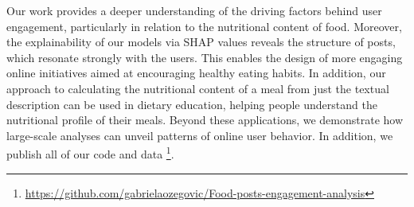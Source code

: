 Our work provides a deeper understanding of the driving factors behind user engagement, particularly in relation to the nutritional content of food.
Moreover, the explainability of our models via SHAP values reveals the structure of posts, which resonate strongly with the users.
This enables the design of more engaging online initiatives aimed at encouraging healthy eating habits.
In addition, our approach to calculating the nutritional content of a meal from just the textual description can be used in dietary education, helping people understand the nutritional profile of their meals.
Beyond these applications, we demonstrate how large-scale analyses can unveil patterns of online user behavior.
In addition, we publish all of our code and data \footnote{\url{https://github.com/gabrielaozegovic/Food-posts-engagement-analysis}}.


